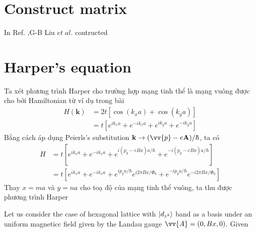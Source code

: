 \documentclass{report}
\begin{document}
\nocite{*}
\renewcommand{\bibname}{REFERENCES}


\appendix
\renewcommand{\chaptername}{Appendix}
\chapter{Construct matrix}
In Ref. \cite{PhysRevB.88.085433},G-B Liu $et \; al$. contructed


\chapter{Harper's equation} \label{appendix b}
Ta xét phương trình Harper cho trường hợp mạng tinh thể là mạng vuông được cho bởi Hamiltonian từ ví dụ trong bài \cite{yalcin_2019}
\begin{equation}
	\begin{aligned}
		H(\mathbf{k})
		 & = 2 t \left[\cos(k_{x} a) + \cos(k_{y} a)\right]                               \\
		 & = t \left[ e^{ik_{x} a} + e^{-ik_{x} a} + e^{ik_{y} a} + e^{-ik_{y} a} \right]
	\end{aligned}
\end{equation}
Bằng cách áp dụng Peierls's substitution $\mathbf{k} \rightarrow (\vv{p} - e \mathbf{A}) / \hbar$, ta có
\begin{equation}
	\begin{aligned}
		H & = t \left[ e^{ik_{x} a} + e^{-ik_{x} a} + e^{i (p_{y} - e Bx) a/\hbar} + e^{-i (p_{y} - e Bx) a/\hbar} \right]                                    \\
		  & = t \left[ e^{ik_{x} a} + e^{-ik_{x} a} + e^{i p_{y} a/\hbar} e^{i 2 \pi Bx / \Phi_{0}} + e^{-i p_{y} a/\hbar} e^{-i 2 \pi Bx / \Phi_{0}} \right]
	\end{aligned}
\end{equation}
Thay $x = ma$ và $y = na$ cho toạ độ của mạng tinh thể vuông, ta thu được phương trình Harper

Let us consider the case of hexagonal lattice with $\ket{d_{z^{2}}}$ band as a basis under an uniform magneticc field given by the Landau gauge $\vv{A} = (0, Bx,0)$. Given
\end{document}
